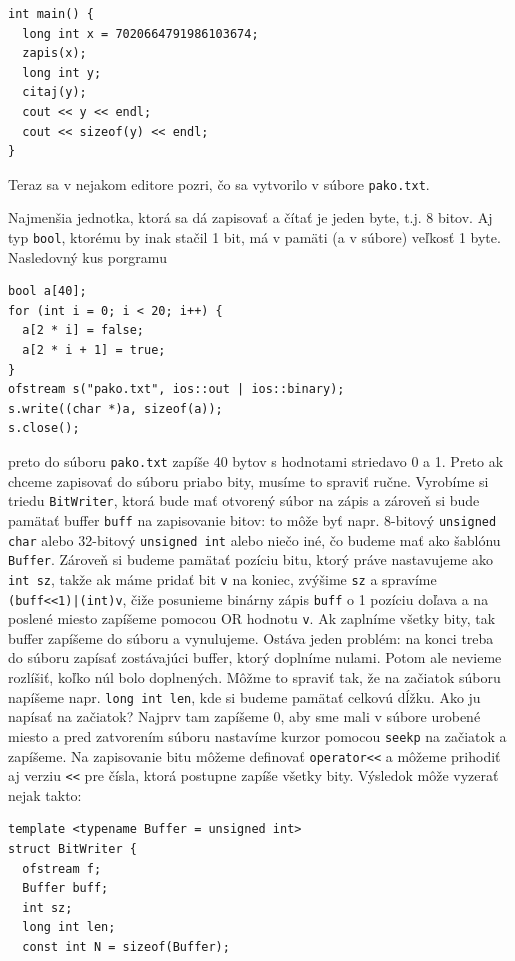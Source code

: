 \documentclass[10pt]{article}
\def\prg{\lstinline}
\def\ods{\vspace*{10pt}}
\begin{document}
{\begin{lstlisting}
int main() {
  long int x = 7020664791986103674;
  zapis(x);
  long int y;
  citaj(y);
  cout << y << endl;
  cout << sizeof(y) << endl;
}
\end{lstlisting}  

Teraz sa v nejakom editore pozri, čo sa vytvorilo v súbore \prg!pako.txt!.

\ods
Najmenšia jednotka, ktorá sa dá zapisovať a čítať je jeden byte, t.j. 8 bitov.
Aj typ \prg!bool!, ktorému by inak stačil 1 bit, má v pamäti (a v súbore)
veľkosť 1 byte. Nasledovný 
kus porgramu

\begin{lstlisting}
bool a[40];
for (int i = 0; i < 20; i++) {
  a[2 * i] = false;
  a[2 * i + 1] = true;
}
ofstream s("pako.txt", ios::out | ios::binary);
s.write((char *)a, sizeof(a));
s.close();
\end{lstlisting}

preto do súboru {\tt pako.txt} zapíše 40 bytov s hodnotami striedavo 0 a 1.
Preto ak chceme zapisovať do súboru priabo bity, musíme to spraviť ručne. Vyrobíme
si triedu {\tt BitWriter}, ktorá bude mať otvorený súbor na zápis a zároveň si bude
pamätať buffer \prg!buff!
na zapisovanie bitov: to môže byť napr. 8-bitový \prg!unsigned char! 
alebo 32-bitový \prg!unsigned int! alebo niečo iné, čo budeme mať ako šablónu
\prg!Buffer!.
Zároveň si budeme pamätať pozíciu bitu, ktorý práve nastavujeme ako \prg!int sz!,
takže ak máme pridať bit \prg!v! na koniec, zvýšime \prg!sz! a
spravíme \prg!(buff<<1)|(int)v!, čiže
posunieme binárny zápis \prg!buff! o 1 pozíciu doľava a na poslené miesto zapíšeme 
pomocou OR hodnotu \prg!v!. Ak zaplníme všetky bity, tak buffer zapíšeme do súboru
a vynulujeme. Ostáva jeden problém: na konci treba do súboru zapísať zostávajúci buffer,
ktorý doplníme nulami. Potom ale nevieme rozlíšiť, koľko núl bolo doplnených.
Môžme to spraviť tak, že na začiatok súboru napíšeme napr. \prg!long int len!, kde
si budeme pamätať celkovú dĺžku. Ako ju napísať na začiatok? Najprv tam zapíšeme 0,
aby sme mali v súbore urobené miesto a pred zatvorením súboru nastavíme kurzor
pomocou \prg!seekp! na začiatok a zapíšeme. Na zapisovanie bitu môžeme definovať
\prg!operator<<! a môžeme prihodiť aj verziu {\tt <<} pre čísla, ktorá postupne
zapíše všetky bity. Výsledok môže vyzerať nejak takto:

\begin{lstlisting}
template <typename Buffer = unsigned int>
struct BitWriter {
  ofstream f;
  Buffer buff;
  int sz;
  long int len;
  const int N = sizeof(Buffer);


\end{lstlisting}}
\end{document}
